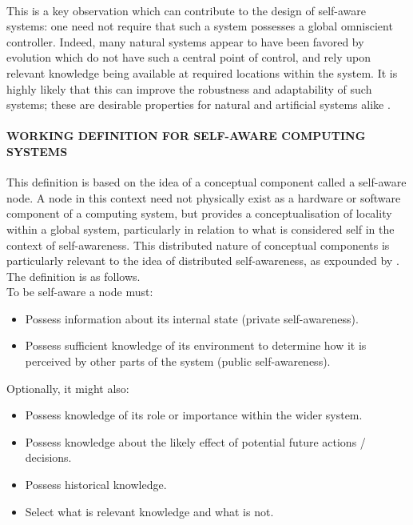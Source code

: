\documentclass{article}
\begin{document}
		\paragraph{} This is a key observation which can contribute to the design of self-aware systems: one need not require that such a system possesses a global omniscient controller. Indeed, many natural systems appear to have been favored
		by evolution which do not have such a central point of control, and rely upon relevant knowledge being available
		at required locations within the system. It is highly likely that this can improve the robustness and adaptability of
		such systems; these are desirable properties for natural and artificial systems alike \citet{mitchell-2005-self-awareness-and-control-in-decentralized-systems}.
		\paragraph{WORKING DEFINITION FOR SELF-AWARE COMPUTING SYSTEMS}
		This definition is based on the idea of a conceptual component called a self-aware node. A node in this context need
		not physically exist as a hardware or software component
		of a computing system, but provides a conceptualisation of
		locality within a global system, particularly in relation to
		what is considered self in the context of self-awareness.
		This distributed nature of conceptual components is particularly relevant to the idea of distributed self-awareness, as
		expounded by \citet{mitchell-2005-self-awareness-and-control-in-decentralized-systems}. The definition is as follows.
		\\
		To be self-aware a node must:
		\begin{itemize}
			\item Possess information about its internal state
			(private self-awareness).
			\item Possess sufficient knowledge of its environment to determine how it is perceived by other
			parts of the system (public self-awareness).
		\end{itemize}
		Optionally, it might also:
		\begin{itemize}
			\item Possess knowledge of its role or importance
			within the wider system.
			\item Possess knowledge about the likely effect of
			potential future actions / decisions.
			\item Possess historical knowledge.
			\item Select what is relevant knowledge and what is
			not.
		\end{itemize}
\end{document}
